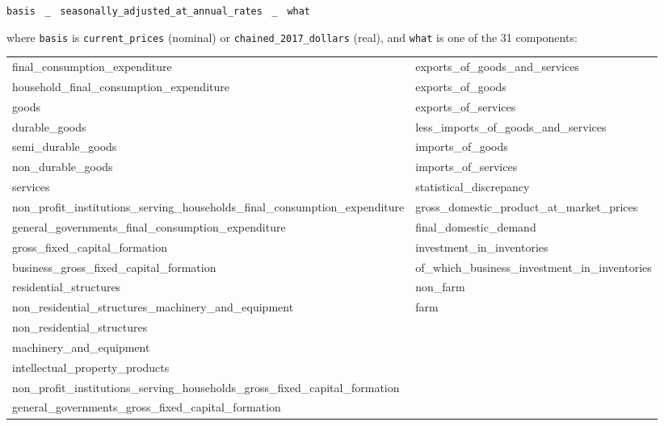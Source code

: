 \documentclass[11pt]{article}
\begin{document}
\begin{center}
\lstinline[style=inl]!basis! \ \lstinline[style=inl]!_! \ \lstinline[style=inl]!seasonally_adjusted_at_annual_rates! \ \lstinline[style=inl]!_! \ \lstinline[style=inl]!what!
\end{center}

where \lstinline[style=inl]!basis! is \lstinline[style=inl]!current_prices! (nominal) or
\lstinline[style=inl]!chained_2017_dollars! (real), and \lstinline[style=inl]!what! is one of the 31 components:

\vspace{-2pt}
{\footnotesize
\begin{center}
\begin{tabular}{@{}ll@{}}
final\_consumption\_expenditure & exports\_of\_goods\_and\_services \\
household\_final\_consumption\_expenditure & exports\_of\_goods \\
goods & exports\_of\_services \\
durable\_goods & less\_imports\_of\_goods\_and\_services \\
semi\_durable\_goods & imports\_of\_goods \\
non\_durable\_goods & imports\_of\_services \\
services & statistical\_discrepancy \\
non\_profit\_institutions\_serving\_households\_final\_consumption\_expenditure & gross\_domestic\_product\_at\_market\_prices \\
general\_governments\_final\_consumption\_expenditure & final\_domestic\_demand \\
gross\_fixed\_capital\_formation & investment\_in\_inventories \\
business\_gross\_fixed\_capital\_formation & of\_which\_business\_investment\_in\_inventories \\
residential\_structures & non\_farm \\
non\_residential\_structures\_machinery\_and\_equipment & farm \\
non\_residential\_structures & \\
machinery\_and\_equipment & \\
intellectual\_property\_products & \\
non\_profit\_institutions\_serving\_households\_gross\_fixed\_capital\_formation & \\
general\_governments\_gross\_fixed\_capital\_formation & \\
\end{tabular}
\end{center}}
\end{document}
